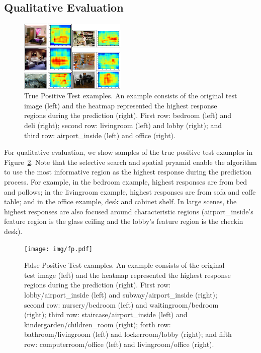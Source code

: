 \subsection{Qualitative Evaluation}
\begin{figure}[ht]
  \centering
  \includegraphics[width=0.45\textwidth]{img/tp.pdf}
  \centering
  \caption{True Positive Test examples. An example consists of the original test image (left) and the heatmap represented the highest response regions during the prediction (right). First row: bedroom (left) and deli (right); second row: livingroom (left) and lobby (right); and third row: airport\_inside (left) and office (right).}
  \label{fig:tp}
\end{figure}

For qualitative evaluation, we show samples of the true positive test examples in Figure~\ref{fig:tp}. Note that the selective search and spatial pryamid enable the algorithm to use the most informative region as the highest response during the prediction process. For example, in the bedroom example, highest responses are from bed and pollows; in the livingroom example, highest responses are from sofa and coffe table; and in the office example, desk and cabinet shelf. In large scenes, the highest responses are also focused around characteristic regions (airport\_inside's feature region is the glass ceiling and  the lobby's feature region is the checkin desk).

\begin{figure}[ht]
  \centering
  \texttt{[image: img/fp.pdf]}
  \centering
  \caption{False Positive Test examples. An example consists of the original test image (left) and the heatmap represented the highest response regions during the prediction (right). First row: lobby/airport\_inside (left) and subway/airport\_inside (right); second row: nursery/bedroom (left) and waitingroom/bedroom (right); third row: staircase/airport\_inside (left) and kindergarden/children\_room (right); forth row: bathroom/livingroom (left) and lockerroom/lobby (right); and fifth row: computerroom/office (left) and livingroom/office (right).}
  \label{fig:tp}
\end{figure}

